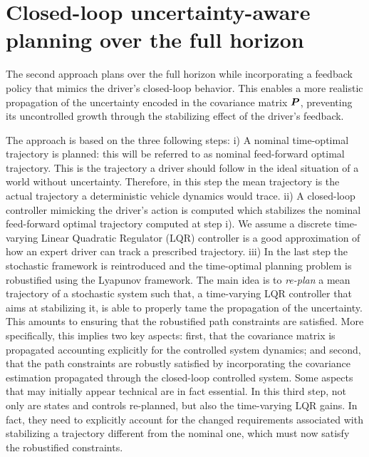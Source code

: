 \section{Closed-loop uncertainty-aware planning over the full horizon}
\label{sec:closed_loop_planning}

The second approach plans over the full horizon while incorporating a feedback policy that mimics the driver's closed-loop behavior. This enables a more realistic propagation of the uncertainty encoded in the covariance matrix $\boldsymbol{P}$, preventing its uncontrolled growth through the stabilizing effect of the driver's feedback.

The approach is based on the three following steps: i) A nominal time-optimal trajectory is planned: this will be referred to as nominal feed-forward optimal trajectory. This is the trajectory a driver should follow in the ideal situation of a world without uncertainty. Therefore, in this step the mean trajectory is the actual trajectory a deterministic vehicle dynamics would trace. ii) A closed-loop controller mimicking the driver's action is computed which stabilizes the nominal feed-forward optimal trajectory computed at step i). We assume a discrete time-varying Linear Quadratic Regulator (LQR) controller is a good approximation of how an expert driver can track a prescribed trajectory. iii) In the last step the stochastic framework is reintroduced and the time-optimal planning problem is robustified using the Lyapunov framework. The main idea is to \emph{re-plan} a mean trajectory of a stochastic system such that, a time-varying LQR controller that aims at stabilizing it, is able to properly tame the propagation of the uncertainty. This amounts to ensuring that the robustified path constraints are satisfied. More specifically, this implies two key aspects: first, that the covariance matrix is propagated accounting explicitly for the controlled system dynamics; and second, that the path constraints are robustly satisfied by incorporating the covariance estimation propagated through the closed-loop controlled system. Some aspects that may initially appear technical are in fact essential. In this third step, not only are states and controls re-planned, but also the time-varying LQR gains. In fact, they need to explicitly account for the changed requirements associated with stabilizing a trajectory different from the nominal one, which must now satisfy the robustified constraints.

